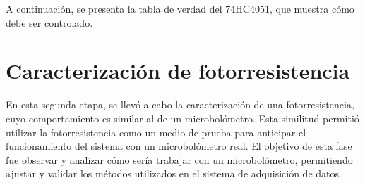 A continuación, se presenta la tabla de verdad del 74HC4051, que muestra cómo debe ser controlado.
            \begin{table}[htbp]
                \caption{Tabla de verdad de multiplexor 74HC4051.}
                \begin{center}
                \label{tab:true_table_mux}
                \end{center}
            \end{table}


\section{Caracterización de fotorresistencia}
En esta segunda etapa, se llevó a cabo la caracterización de una fotorresistencia, cuyo comportamiento es similar al de un microbolómetro. Esta similitud permitió utilizar la fotorresistencia como un medio de prueba para anticipar el funcionamiento del sistema con un microbolómetro real. El objetivo de esta fase fue observar y analizar cómo sería trabajar con un microbolómetro, permitiendo ajustar y validar los métodos utilizados en el sistema de adquisición de datos.


